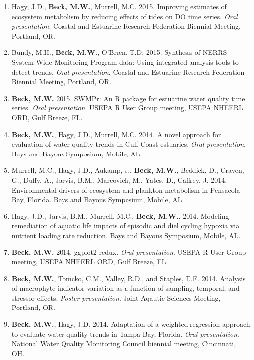 \documentclass[letterpaper,12pt]{article}
\begin{document}
\begin{enumerate}
\item Hagy, J.D., {\bf Beck, M.W.}, Murrell, M.C. 2015. Improving estimates of ecosystem metabolism by reducing effects of tides on DO time series. \textit{Oral presentation}. Coastal and Estuarine Research Federation Biennial Meeting, Portland, OR. 

\item Bundy, M.H., {\bf Beck, M.W.}, O'Brien, T.D. 2015. Synthesis of NERRS System-Wide Monitoring Program data: Using integrated analysis tools to detect trends. \textit{Oral presentation}. Coastal and Estuarine Research Federation Biennial Meeting, Portland, OR.

\item {\bf Beck, M.W.} 2015. SWMPr: An R package for estuarine water quality time series. \textit{Oral presentation}. USEPA R User Group meeting, USEPA NHEERL ORD, Gulf Breeze, FL.

\item {\bf Beck, M.W.}, Hagy, J.D., Murrell, M.C. 2014. A novel approach for evaluation of water quality trends in Gulf Coast estuaries. \textit{Oral presentation}. Bays and Bayous Symposium, Mobile, AL.

\item Murrell, M.C., Hagy, J.D., Aukamp, J., {\bf Beck, M.W.}, Beddick, D., Craven, G., Duffy, A., Jarvis, B.M., Marcovich, M., Yates, D., Caffrey, J. 2014. Environmental drivers of ecosystem and plankton metabolism in Pensacola Bay, Florida. Bays and Bayous Symposium, Mobile, AL. 

\item Hagy, J.D., Jarvis, B.M., Murrell, M.C., {\bf Beck, M.W.}. 2014. Modeling remediation of aquatic life impacts of episodic and diel cycling hypoxia via nutrient loading rate reduction. Bays and Bayous Symposium, Mobile, AL. 

\item {\bf Beck, M.W.} 2014. ggplot2 redux. \textit{Oral presentation}. USEPA R User Group meeting, USEPA NHEERL ORD, Gulf Breeze, FL.

\item {\bf Beck, M.W.}, Tomcko, C.M., Valley, R.D., and Staples, D.F. 2014. Analysis of macrophyte indicator variation as a function of sampling, temporal, and stressor effects. \textit{Poster presentation}. Joint Aqautic Sciences Meeting, Portland, OR.

\item {\bf Beck, M.W.}, Hagy, J.D. 2014. Adaptation of a weighted regression approach to evaluate water quality trends in {T}ampa {B}ay, {F}lorida. \textit{Oral presentation}. National Water Quality Monitoring Council biennial meeting, Cincinnati, OH.


\end{enumerate}
\end{document}
